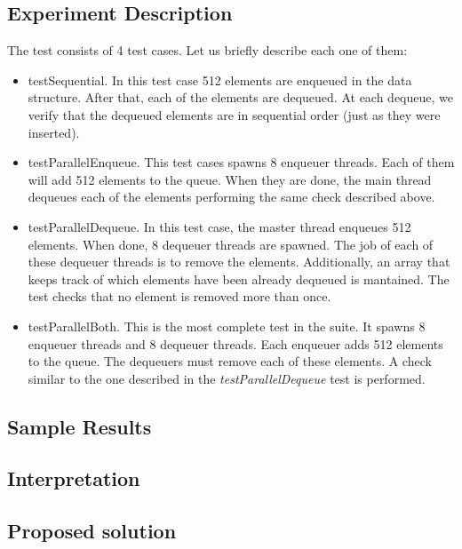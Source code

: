 \subsection{Experiment Description}
\par
The test consists of 4 test cases. Let us briefly describe each one of them:
\par
\begin{itemize}
\item testSequential. In this test case 512 elements are enqueued in the data
structure. After that, each of the elements are dequeued. At each dequeue, we
verify that the dequeued elements are in sequential order (just as they were
inserted).
\item testParallelEnqueue. This test cases spawns $8$ enqueuer threads. Each of
them will add 512 elements to the queue. When they are done, the main thread
dequeues each of the elements performing the same check described above.
\item testParallelDequeue. In this test case, the master thread enqueues 512
elements. When done, 8 dequeuer threads are spawned. The job of each of these
dequeuer threads is to remove the elements. Additionally, an array that keeps
track of which elements have been already dequeued is mantained. The test
checks that no element is removed more than once.
\item testParallelBoth. This is the most complete test in the suite. It spawns
8 enqueuer threads and 8 dequeuer threads. Each enqueuer adds 512 elements to
the queue. The dequeuers must remove each of these elements. A check similar to
the one described in the \textit{testParallelDequeue} test is performed.
\end{itemize}
\par
\subsection{Sample Results}
\par
\par
\subsection{Interpretation}
\par
\par
\subsection{Proposed solution}
\par
\par

